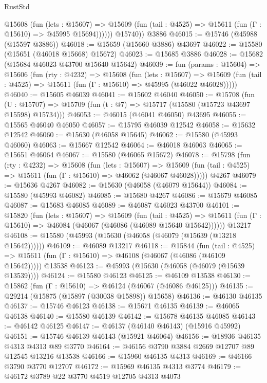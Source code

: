 \begin{lexlean}{RustStd}
\begin{coremodule}
            @15608
              (fun (lets : @15607) =>
              @15609 (fun (tail : @4525) => @15611 (fun (Γ : @15610) => @45995 @15694))))))
        @15740))
    @3886
@46015 := @15746 (@45988 (@15597 @3886))
@46018 := @15659 (@15660 @3886) @43697
@46022 := @15580 (@15651 (@46018 @15668) @15672)
@46023 := @15685 @3886
@46028 := @15682 (@15684 @46023 @43700 @15640 @15642)
@46039 := fun (params : @15604) =>
  @15606
    (fun (rty : @4232) =>
    @15608
      (fun (lets : @15607) =>
      @15609 (fun (tail : @4525) => @15611 (fun (Γ : @15610) => @45995 (@46022 @46028)))))
@46040 := @15605 @46039
@46041 := @15602 @46040
@46050 := @15708
    (fun (U : @15707) => @15709 (fun (t : @7) => @15717 (@15580 (@15723 @43697 @15598) @15734)))
@46053 := @46015 (@46041 @46050) @43695
@46055 := @15565 @46040 @46050
@46057 := @15795 @46039 @12542
@46058 := @15632 @12542
@46060 := @15630 (@46058 @15645)
@46062 := @15580 (@45993 @46060)
@46063 := @15667 @12542
@46064 := @46018 @46063
@46065 := @15651 @46064
@46067 := @15580 (@46065 @15672)
@46078 := @15798
    (fun (rty : @4232) =>
    @15608
      (fun (lets : @15607) =>
      @15609 (fun (tail : @4525) => @15611 (fun (Γ : @15610) => @46062 (@46067 @46028)))))
    @4267
@46079 := @15636 @4267
@46082 := @15630 (@46058 (@46079 @15644))
@46084 := @15580 (@45993 @46082)
@46085 := @15680 @4267
@46086 := @15679 @46085
@46087 := @15683 @46085
@46089 := @46087 @46023 @43700
@46101 := @15820
    (fun (lets : @15607) =>
    @15609
      (fun (tail : @4525) =>
      @15611 (fun (Γ : @15610) => @46084 (@46067 (@46086 (@46089 @15640 @15642))))))
    @13217
@46108 := @15580 (@45993 (@15630 (@46058 (@46079 (@15639 (@13218 @15642))))))
@46109 := @46089 @13217
@46118 := @15844
    (fun (tail : @4525) => @15611 (fun (Γ : @15610) => @46108 (@46067 (@46086 (@46109 @15642)))))
    @13538
@46123 := @45993 (@15630 (@46058 (@46079 (@15639 @13539))))
@46124 := @15580 @46123
@46125 := @46109 @13538
@46130 := @15862 (fun (Γ : @15610) => @46124 (@46067 (@46086 @46125)))
@46135 := @29214 (@15875 (@15897 (@30038 @15898)) @15658)
@46136 := @46130 @46135
@46137 := @15746 @46123
@46138 := @15671 @46135
@46139 := @46065 @46138
@46140 := @15580 @46139
@46142 := @15678 @46135 @46085
@46143 := @46142 @46125
@46147 := @46137 (@46140 @46143) (@15916 @45992)
@46151 := @15746 @46139 @46143 (@15921 @46064)
@46156 := @18936 @46135 @4313 @4313 @89 @3770
@46164 := @46156 @3790 @3884 @2669 @12707 @89 @12545 @13216 @13538
@46166 := @15960 @46135 @4313
@46169 := @46166 @3790 @3770 @12707
@46172 := @15969 @46135 @4313 @3774
@46179 := @46172 @3789 @22 @3770 @4519 @12705 @4313 @4073

\end{coremodule}
\end{lexlean}
